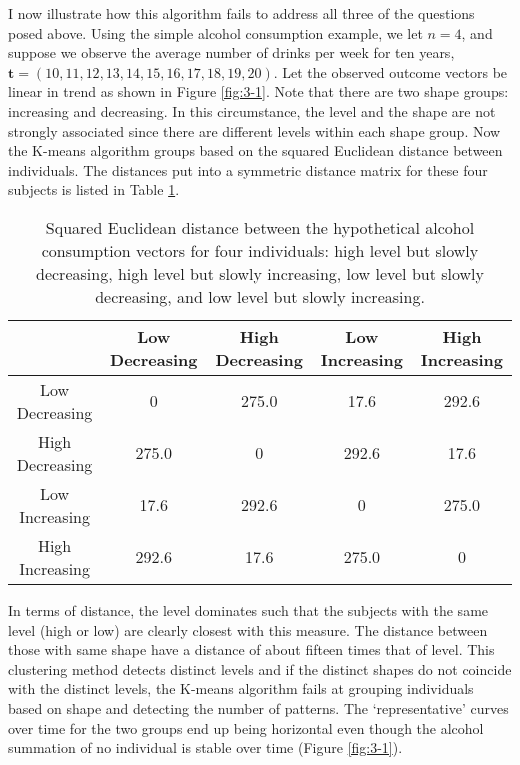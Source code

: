 \documentclass[12pt]{article}
\newcommand{\B}[0]{\mathbf}
\begin{document}
I now illustrate how this algorithm fails to address all three of the questions posed above. Using the simple alcohol consumption example, we let $n=4$, and suppose we observe the average number of drinks per week for ten years, $\B t=(10,11,12,13,14,15,16,17,18,19,20)$. Let the observed outcome vectors be linear in trend as shown in Figure \ref{fig:3-1}. Note that there are two shape groups: increasing and decreasing. In this circumstance, the level and the shape are not strongly associated since there are different levels within each shape group. Now the K-means algorithm groups based on the squared Euclidean distance between individuals. The distances put into a symmetric distance matrix for these four subjects is listed in Table \ref{tab:3-1}. 
\begin{table}[h]
\begin{center}
\begin{tabular}{c|cccc}
&Low Decreasing& High Decreasing&Low Increasing&High Increasing\\
\hline
Low Decreasing&0&275.0&17.6&292.6\\
High Decreasing&275.0  &0 &  292.6 &17.6 \\                     
Low Increasing& 17.6 &292.6  &0   &275.0   \\          
High Increasing& 292.6 &17.6 &275.0   &0 
\end{tabular}
\end{center}
\caption{Squared Euclidean distance between the hypothetical alcohol consumption vectors for four individuals: high level but slowly decreasing, high level but slowly increasing, low level but slowly decreasing, and low level but slowly increasing. }
\label{tab:3-1}
\end{table}
In terms of distance, the level dominates such that the subjects with the same level (high or low) are clearly closest with this measure. The distance between those with same shape have a distance of about fifteen times that of level. This clustering method detects distinct levels and if the distinct shapes do not coincide with the distinct levels, the K-means algorithm fails at grouping individuals based on shape and detecting the number of patterns. The `representative' curves over time for the two groups end up being horizontal even though the alcohol summation of no individual is stable over time (Figure \ref{fig:3-1}).\\
\end{document}
